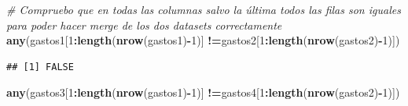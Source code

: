 \documentclass[notspecified,article,submit,moreauthors,pdftex]{Definitions/mdpi}
\newenvironment{Shaded}{\begin{snugshade}}{\end{snugshade}}
\newcommand{\AttributeTok}[1]{\textcolor[rgb]{0.13,0.29,0.53}{#1}}
\newcommand{\CommentTok}[1]{\textcolor[rgb]{0.56,0.35,0.01}{\textit{#1}}}
\newcommand{\DecValTok}[1]{\textcolor[rgb]{0.00,0.00,0.81}{#1}}
\newcommand{\FunctionTok}[1]{\textcolor[rgb]{0.13,0.29,0.53}{\textbf{#1}}}
\newcommand{\NormalTok}[1]{#1}
\newcommand{\OtherTok}[1]{\textcolor[rgb]{0.56,0.35,0.01}{#1}}
\newcommand{\SpecialCharTok}[1]{\textcolor[rgb]{0.81,0.36,0.00}{\textbf{#1}}}
\newcommand{\StringTok}[1]{\textcolor[rgb]{0.31,0.60,0.02}{#1}}
\begin{document}
\begin{Shaded}
\end{Shaded}

\begin{Shaded}
\begin{Highlighting}[]
\CommentTok{\# Compruebo que en todas las columnas salvo la última todos las filas son iguales para poder hacer merge de los dos datasets correctamente}
\FunctionTok{any}\NormalTok{(gastos1[}\DecValTok{1}\SpecialCharTok{:}\FunctionTok{length}\NormalTok{(}\FunctionTok{nrow}\NormalTok{(gastos1)}\SpecialCharTok{{-}}\DecValTok{1}\NormalTok{)] }\SpecialCharTok{!=}\NormalTok{gastos2[}\DecValTok{1}\SpecialCharTok{:}\FunctionTok{length}\NormalTok{(}\FunctionTok{nrow}\NormalTok{(gastos2)}\SpecialCharTok{{-}}\DecValTok{1}\NormalTok{)])}
\end{Highlighting}
\end{Shaded}

\begin{verbatim}
## [1] FALSE
\end{verbatim}

\begin{Shaded}
\begin{Highlighting}[]
\FunctionTok{any}\NormalTok{(gastos3[}\DecValTok{1}\SpecialCharTok{:}\FunctionTok{length}\NormalTok{(}\FunctionTok{nrow}\NormalTok{(gastos1)}\SpecialCharTok{{-}}\DecValTok{1}\NormalTok{)] }\SpecialCharTok{!=}\NormalTok{gastos4[}\DecValTok{1}\SpecialCharTok{:}\FunctionTok{length}\NormalTok{(}\FunctionTok{nrow}\NormalTok{(gastos2)}\SpecialCharTok{{-}}\DecValTok{1}\NormalTok{)])}
\end{Highlighting}
\end{Shaded}
\end{document}

